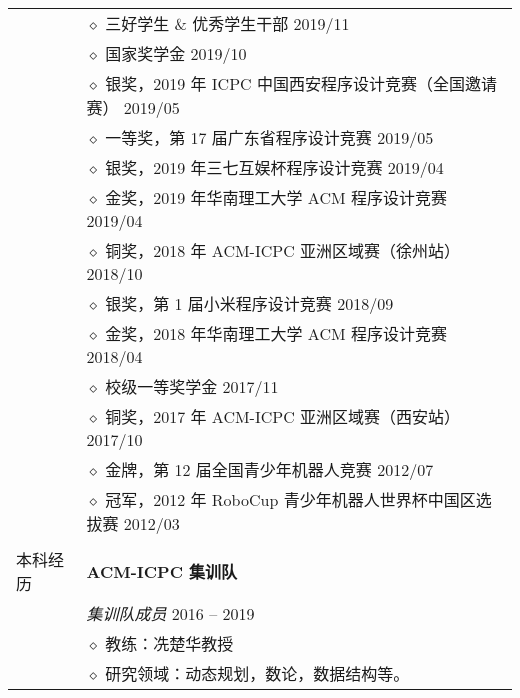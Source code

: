 \documentclass[letterpaper, 10pt]{article}
\begin{document}
\begin{longtable}{p{1.3in}p{5.0in}}
& $\diamond$ 三好学生 \& 优秀学生干部 \hfill 2019/11 \\

& $\diamond$ 国家奖学金 \hfill 2019/10 \\

& $\diamond$ 银奖，2019 年 ICPC 中国西安程序设计竞赛（全国邀请赛） \hfill 2019/05 \\

& $\diamond$ 一等奖，第 17 届广东省程序设计竞赛 \hfill 2019/05 \\

& $\diamond$ 银奖，2019 年三七互娱杯程序设计竞赛 \hfill 2019/04 \\

& $\diamond$ 金奖，2019 年华南理工大学 ACM 程序设计竞赛 \hfill 2019/04 \\

& $\diamond$ 铜奖，2018 年 ACM-ICPC 亚洲区域赛（徐州站） \hfill 2018/10 \\

& $\diamond$ 银奖，第 1 届小米程序设计竞赛 \hfill 2018/09 \\

& $\diamond$ 金奖，2018 年华南理工大学 ACM 程序设计竞赛 \hfill 2018/04 \\

& $\diamond$ 校级一等奖学金 \hfill 2017/11 \\

& $\diamond$ 铜奖，2017 年 ACM-ICPC 亚洲区域赛（西安站） \hfill 2017/10 \\

& $\diamond$ 金牌，第 12 届全国青少年机器人竞赛 \hfill 2012/07\\

& $\diamond$ 冠军，2012 年 RoboCup 青少年机器人世界杯中国区选拔赛 \hfill 2012/03 \\

& \\


{本科经历}
& \textbf{ACM-ICPC 集训队} \\
& \textit{集训队成员} \hfill 2016 -- 2019 \\
& $\diamond$ 教练：冼楚华教授 \\
& $\diamond$ 研究领域：动态规划，数论，数据结构等。 \\


\end{longtable}
\end{document}
